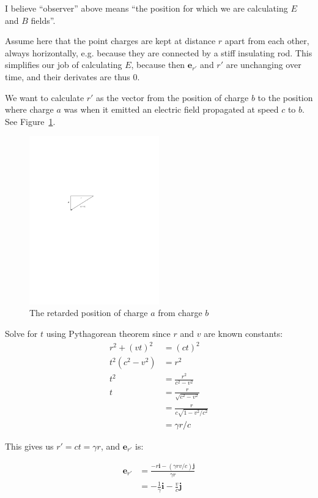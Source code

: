 \documentclass[a4paper]{article}
\theoremstyle{plain}
\theoremstyle{definition}
\newcommand{\ihat}{\textbf{i}}
\newcommand{\jhat}{\textbf{j}}
\newcommand{\vect}[1]{\textbf{#1}}
\begin{document}
I believe ``observer'' above means ``the position for which we are
calculating $E$ and $B$ fields''.

Assume here that the point charges are kept at distance $r$ apart from
each other, always horizontally, e.g. because they are connected by a
stiff insulating rod.  This simplifies our job of calculating $E$,
because then $\vect{e}_{r'}$ and $r'$ are unchanging over time, and
their derivates are thus 0.

We want to calculate $r'$ as the vector from the position of charge
$b$ to the position where charge $a$ was when it emitted an electric
field propagated at speed $c$ to $b$.  See
Figure~\ref{fig:retarded-position}.

\begin{figure}[ht]
	\centering
	\includegraphics[width=0.5\textwidth]{retarded-position-cropped.pdf}
	\caption{The retarded position of charge $a$ from charge $b$}
	\label{fig:retarded-position}
\end{figure}

Solve for $t$ using Pythagorean theorem since $r$ and $v$ are known
constants:
\begin{align*}
r^2 + (vt)^2 & = (ct)^2 \\
t^2 (c^2 - v^2) & = r^2 \\
t^2 & = \frac{r^2}{c^2 - v^2} \\
t & = \frac{r}{\sqrt{c^2-v^2}} \\
  & = \frac{r}{c \sqrt{1 - v^2/c^2}} \\
  & = \gamma r / c
\end{align*}

This gives us $r' = ct = \gamma r$, and $\vect{e}_{r'}$ is:

\begin{align*}
\vect{e}_{r'} & = \frac{-r \ihat - (\gamma r v / c) \jhat}{\gamma r} \\
  & = - \frac{1}{\gamma} \ihat - \frac{v}{c} \jhat
\end{align*}
\end{document}
